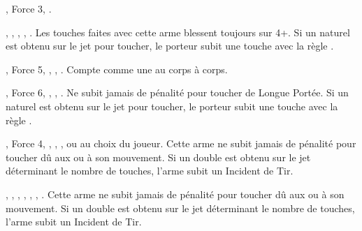 \closearmyspecialrules






\newpage
\renewcommand{\startarmyarmoury}{\largefontsize}
\startarmyarmoury

\begin{multicols}{2}\raggedcolumns

\subtitle{Armes de Tir}

\startpricelist

\nopricelistitem{\sling} , Force 3, \quicktofire{}.

\nopricelistitem{\gasglobe} , \magicalattacks{}, , \volleyfire{}, \quicktofire{}.\vspace{2pt}\newline
Les touches faites avec cette arme blessent toujours sur 4+. Si un  naturel est obtenu sur le jet pour toucher, le porteur subit une touche avec la règle \toxicattacks{}.

\nopricelistitem{\ratlockpistol} , Force 5, \magicalattacks{}, , \quicktofire{}. \vspace{2pt}\newline
Compte comme une \pw{} au corps à corps.

\nopricelistitem{\jezail} , Force 6, \magicalattacks{}, \unwieldy{}, .\vspace{2pt}\newline
Ne subit jamais de pénalité pour toucher de Longue Portée. Si un  naturel est obtenu sur le jet pour toucher, le porteur subit une touche avec la règle \toxicattacks{}.

\nopricelistitem{\rotarygun} , Force 4, \magicalattacks{}, \volatile{}, \reload{},  ou  au choix du joueur.\vspace{2pt}\newline
Cette arme ne subit jamais de pénalité pour toucher dû aux \multipleshots{} ou à son mouvement. Si un double est obtenu sur le jet déterminant le nombre de touches, l'arme subit un Incident de Tir.

\nopricelistitem{\globelauncher} , \magicalattacks{}, \toxicattacks{}, \volatile{}, \reload{}, \volleyfire{}, .\vspace{2pt}\newline
Cette arme ne subit jamais de pénalité pour toucher dû aux \multipleshots{} ou à son mouvement. Si un double est obtenu sur le jet déterminant le nombre de touches, l'arme subit un Incident de Tir.


\end{multicols}
